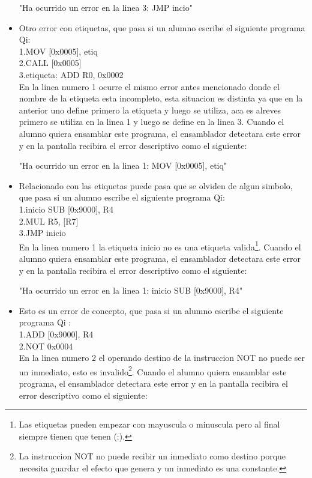 \begin{itemize}
"Ha ocurrido un error en la linea 3: JMP incio" \\ 

\item Otro error con etiquetas, que pasa si un alumno escribe el siguiente programa Qi:\\

1.MOV [0x0005], etiq \\
2.CALL [0x0005] \\
3.etiqueta: ADD R0, 0x0002 \\

En la linea numero 1 ocurre el mismo error antes mencionado donde el nombre de la etiqueta esta incompleto, esta situacion es distinta ya que en la anterior uno define primero la etiqueta y luego se utiliza, aca es alreves primero se utiliza en la linea 1 y luego se define en la linea 3. Cuando el alumno quiera ensamblar este programa, el ensamblador detectara este error y en la pantalla recibira el error descriptivo como el siguiente:

"Ha ocurrido un error en la linea 1: MOV [0x0005], etiq" \\


\item Relacionado con las etiquetas puede pasa que se olviden de algun simbolo, que pasa si un alumno escribe el siguiente programa Qi:\\

1.inicio SUB [0x9000], R4 \\
2.MUL R5, [R7] \\
3.JMP inicio \\

En la linea numero 1 la etiqueta inicio no es una etiqueta valida\footnote{Las etiquetas pueden empezar con mayuscula o minuscula pero al final siempre tienen que tenen (:).}. Cuando el alumno quiera ensamblar este programa, el ensamblador detectara este error y en la pantalla recibira el error descriptivo como el siguiente:

"Ha ocurrido un error en la linea 1: inicio SUB [0x9000], R4" \\ 


\item Esto es un error de concepto, que pasa si un alumno escribe el siguiente programa Qi :\\

1.ADD [0x9000], R4 \\
2.NOT 0x0004 \\

En la linea numero 2 el operando destino de la instruccion NOT no puede ser un inmediato, esto es invalido\footnote{La instruccion NOT no puede recibir un inmediato como destino porque necesita guardar el efecto que genera y un inmediato es una constante.}. Cuando el alumno quiera ensamblar este programa, el ensamblador detectara este error y en la pantalla recibira el error descriptivo como el siguiente:


\end{itemize}
